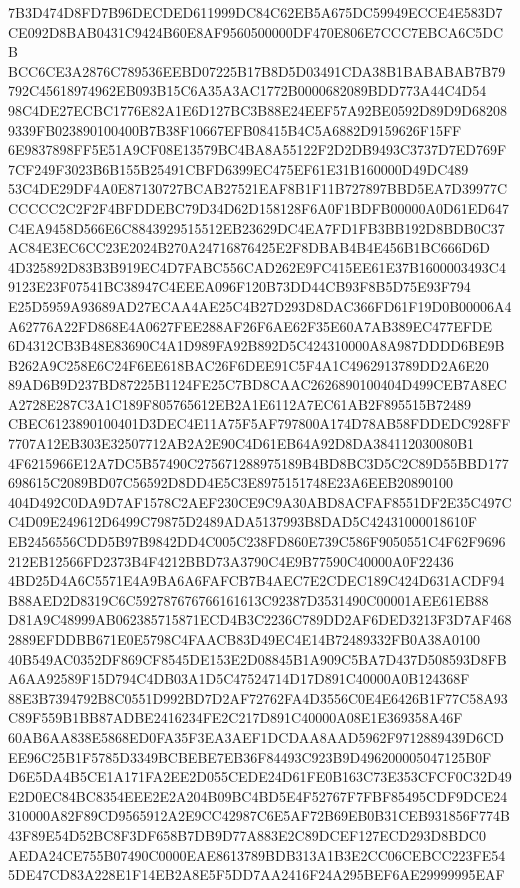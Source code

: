 \documentclass[UTF8,fontset=fandol,zihao=-4,a4paper]{ctexart}
\begin{document}
{{7B3D474D8FD7B96DECDED611999DC84C62EB5A675DC59949ECCE4E583D7CE092D8BAB0431C9424B60E8AF9560500000DF470E806E7CCC7EBCA6C5DCB
BCC6CE3A2876C789536EEBD07225B17B8D5D03491CDA38B1BABABAB7B79792C45618974962EB093B15C6A35A3AC1772B0000682089BDD773A44C4D54
98C4DE27ECBC1776E82A1E6D127BC3B88E24EEF57A92BE0592D89D9D682089339FB023890100400B7B38F10667EFB08415B4C5A6882D9159626F15FF
6E9837898FF5E51A9CF08E13579BC4BA8A55122F2D2DB9493C3737D7ED769F7CF249F3023B6B155B25491CBFD6399EC475EF61E31B160000D49DC489
53C4DE29DF4A0E87130727BCAB27521EAF8B1F11B727897BBD5EA7D39977CCCCCC2C2F2F4BFDDEBC79D34D62D158128F6A0F1BDFB00000A0D61ED647
C4EA9458D566E6C8843929515512EB23629DC4EA7FD1FB3BB192D8BDB0C37AC84E3EC6CC23E2024B270A24716876425E2F8DBAB4B4E456B1BC666D6D
4D325892D83B3B919EC4D7FABC556CAD262E9FC415EE61E37B1600003493C49123E23F07541BC38947C4EEEA096F120B73DD44CB93F8B5D75E93F794
E25D5959A93689AD27ECAA4AE25C4B27D293D8DAC366FD61F19D0B00006A4A62776A22FD868E4A0627FEE288AF26F6AE62F35E60A7AB389EC477EFDE
6D4312CB3B48E83690C4A1D989FA92B892D5C424310000A8A987DDDD6BE9BB262A9C258E6C24F6EE618BAC26F6DEE91C5F4A1C4962913789DD2A6E20
89AD6B9D237BD87225B1124FE25C7BD8CAAC2626890100404D499CEB7A8ECA2728E287C3A1C189F805765612EB2A1E6112A7EC61AB2F895515B72489
CBEC6123890100401D3DEC4E11A75F5AF797800A174D78AB58FDDEDC928FF7707A12EB303E32507712AB2A2E90C4D61EB64A92D8DA384112030080B1
4F6215966E12A7DC5B57490C275671288975189B4BD8BC3D5C2C89D55BBD177698615C2089BD07C56592D8DD4E5C3E8975151748E23A6EEB20890100
404D492C0DA9D7AF1578C2AEF230CE9C9A30ABD8ACFAF8551DF2E35C497CC4D09E249612D6499C79875D2489ADA5137993B8DAD5C42431000018610F
EB2456556CDD5B97B9842DD4C005C238FD860E739C586F9050551C4F62F9696212EB12566FD2373B4F4212BBD73A3790C4E9B77590C40000A0F22436
4BD25D4A6C5571E4A9BA6A6FAFCB7B4AEC7E2CDEC189C424D631ACDF94B88AED2D8319C6C592787676766161613C92387D3531490C00001AEE61EB88
D81A9C48999AB062385715871ECD4B3C2236C789DD2AF6DED3213F3D7AF4682889EFDDBB671E0E5798C4FAACB83D49EC4E14B72489332FB0A38A0100
40B549AC0352DF869CF8545DE153E2D08845B1A909C5BA7D437D508593D8FBA6AA92589F15D794C4DB03A1D5C47524714D17D891C40000A0B124368F
88E3B7394792B8C0551D992BD7D2AF72762FA4D3556C0E4E6426B1F77C58A93C89F559B1BB87ADBE2416234FE2C217D891C40000A08E1E369358A46F
60AB6AA838E5868ED0FA35F3EA3AEF1DCDAA8AAD5962F9712889439D6CDEE96C25B1F5785D3349BCBEBE7EB36F84493C923B9D496200005047125B0F
D6E5DA4B5CE1A171FA2EE2D055CEDE24D61FE0B163C73E353CFCF0C32D49E2D0EC84BC8354EEE2E2A204B09BC4BD5E4F52767F7FBF85495CDF9DCE24
310000A82F89CD9565912A2E9CC42987C6E5AF72B69EB0B31CEB931856F774B43F89E54D52BC8F3DF658B7DB9D77A883E2C89DCEF127ECD293D8BDC0
AEDA24CE755B07490C0000EAE8613789BDB313A1B3E2CC06CEBCC223FE545DE47CD83A228E1F14EB2A8E5F5DD7AA2416F24A295BEF6AE29999995EAF
}}
\end{document}
